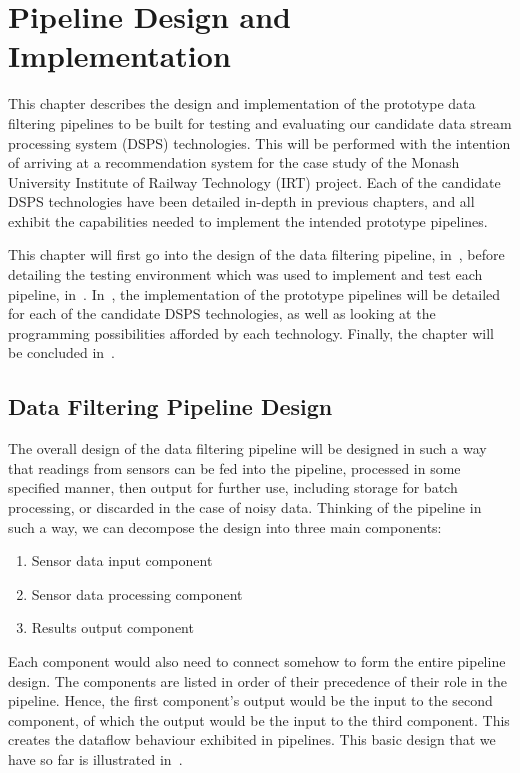 \section{Pipeline Design and Implementation}
\label{sec:implementation}

This chapter describes the design and implementation of the prototype data filtering pipelines to be built for testing
and evaluating our candidate data stream processing system (DSPS) technologies. This will be performed with the intention
of arriving at a recommendation system for the case study of the Monash University Institute of Railway Technology (IRT)
project. Each of the candidate DSPS technologies have been detailed in-depth in previous chapters, and all exhibit the capabilities
needed to implement the intended prototype pipelines.

This chapter will first go into the design of the data filtering pipeline, in~, before
detailing the testing environment which was used to implement and test each pipeline, in~.
In~, the implementation of the prototype pipelines will be
detailed for each of the candidate DSPS technologies, as well as looking at the programming possibilities afforded by
each technology. Finally, the chapter will be concluded in~.


\subsection{Data Filtering Pipeline Design} %
\label{sub:pipeline_design}

The overall design of the data filtering pipeline will be designed in such a way that readings from sensors can be fed
into the pipeline, processed in some specified manner, then output for further use, including storage for batch processing,
or discarded in the case of noisy data. Thinking of the pipeline in such a way, we can decompose the design into three main
components:

\begin{enumerate}
  \item Sensor data input component
  \item Sensor data processing component
  \item Results output component
\end{enumerate}

Each component would also need to connect somehow to form the entire pipeline design. The components are listed
in order of their precedence of their role in the pipeline. Hence, the first component's output would be the input to
the second component, of which the output would be the input to the third component. This creates the dataflow behaviour
exhibited in pipelines. This basic design that we have so far is illustrated in~.

